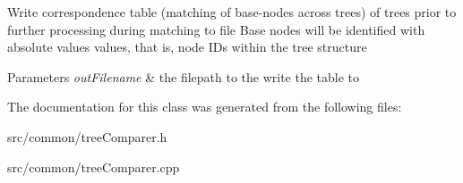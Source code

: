 \-Write correspondence table (matching of base-\/nodes across trees) of trees prior to further processing during matching to file \-Base nodes will be identified with absolute values values, that is, node \-I\-Ds within the tree structure 
\begin{DoxyParams}{\-Parameters}
{\em out\-Filename} & the filepath to the write the table to \\
\hline
\end{DoxyParams}


\-The documentation for this class was generated from the following files\-:\begin{DoxyCompactItemize}
\item 
src/common/tree\-Comparer.\-h\item 
src/common/tree\-Comparer.\-cpp\end{DoxyCompactItemize}
